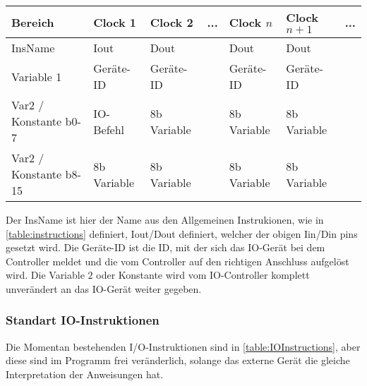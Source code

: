 \documentclass{scrartcl}
\begin{document}
\begin{center}
	\begin{table}[h]
		\caption{\label{table:IO_Assembler_Schem}}
		\begin{tabular}{l | l | l | l | l | l | l}
			 Bereich & Clock 1 & Clock 2 & ... & Clock $n$ & Clock $n+1$ & ... \\
			\hline
			InsName 				& Iout 		  & Dout        &   & Dout        & Dout       \\
			Variable 1 				& Geräte-ID   & Geräte-ID   &   & Geräte-ID   & Geräte-ID  \\
			Var2 / Konstante b0-7 	& IO-Befehl   & 8b Variable &   & 8b Variable & 8b Variable\\
			Var2 / Konstante b8-15 	& 8b Variable & 8b Variable &   & 8b Variable & 8b Variable
 		\end{tabular}
	\end{table}
\end{center}
Der InsName ist hier der Name aus den Allgemeinen Instrukionen, wie in \autoref{table:instructions} definiert, Iout/Dout definiert, welcher der obigen Iin/Din pins gesetzt wird.
Die Geräte-ID ist die ID, mit der sich das IO-Gerät bei dem Controller meldet und die vom Controller auf den richtigen Anschluss aufgelöst wird.
Die Variable $2$ oder Konstante wird vom IO-Controller komplett unverändert an das IO-Gerät weiter gegeben.

\subsubsection{\label{section:IO-Device-Instructions}Standart IO-Instruktionen}

Die Momentan bestehenden I/O-Instruktionen sind in \autoref{table:IOInstructions}, aber diese sind im Programm frei veränderlich, solange das externe Gerät die gleiche Interpretation der Anweisungen hat.
\end{document}
